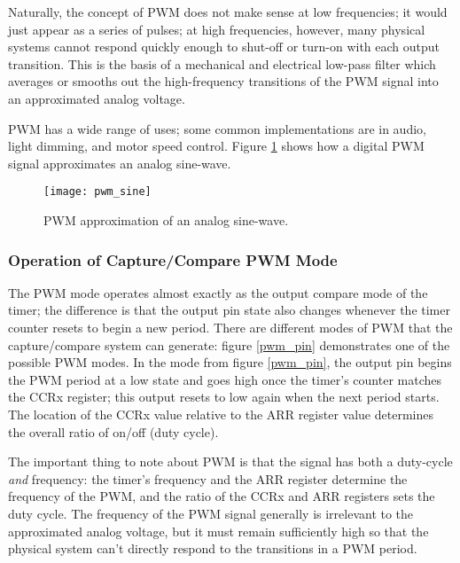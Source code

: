 \documentclass[openany,11pt,fleqn]{book} %
\begin{document}
    Naturally, the concept of PWM does not make sense at low frequencies; it would just appear as a series of pulses; at high frequencies, however, many physical systems cannot respond quickly enough to shut-off or turn-on with each output transition. This is the basis of a mechanical and electrical low-pass filter which averages or smooths out the high-frequency transitions of the PWM signal into an approximated analog voltage.
    
    PWM has a wide range of uses; some common implementations are in audio, light dimming, and motor speed control. Figure \ref{pwm_sine} shows how a digital PWM signal approximates an analog sine-wave. 

    \begin{figure}[]
        \centering\texttt{[image: pwm\_sine]}
        \caption{PWM approximation of an analog sine-wave.}
        \label{pwm_sine}
    \end{figure}
    
    \subsubsection{Operation of Capture/Compare PWM Mode}
    The PWM mode operates almost exactly as the output compare mode of the timer; the difference is that the output pin state also changes whenever the timer counter resets to begin a new period. There are different modes of PWM that the capture/compare system can generate: figure \ref{pwm_pin} demonstrates one of the possible PWM modes. In the mode from figure \ref{pwm_pin}, the output pin begins the PWM period at a low state and goes high once the timer's counter matches the CCRx register; this output resets to low again when the next period starts. The location of the CCRx value relative to the ARR register value determines the overall ratio of on/off (duty cycle). 
   
   The important thing to note about PWM is that the signal has both a duty-cycle \textit{and} frequency: the timer's frequency and the ARR register determine the frequency of the PWM, and the ratio of the CCRx and ARR registers sets the duty cycle. The frequency of the PWM signal generally is irrelevant to the approximated analog voltage, but it must remain sufficiently high so that the physical system can't directly respond to the transitions in a PWM period. 
   
\end{document}
